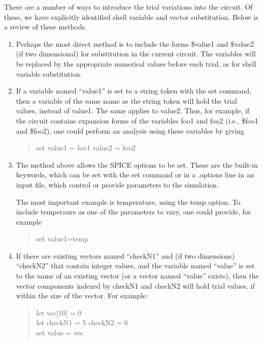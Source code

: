 There are a number of ways to introduce the trial variations into the
circuit.  Of these, we have explicitly identified shell variable and
vector substitution.  Below is a review of these methods.

\begin{enumerate}
\item{
Perhaps the most direct method is to include the forms {\vt \$value1}
and {\vt \$value2} (if two dimensional) for substitution in the
current circuit.  The variables will be replaced by the appropriate
numerical values before each trial, as for shell variable
substitution.
}

\item{
If a variable named ``{\vt value1}'' is set to a string token with the
{\cb set} command, then a variable of the same name as the string
token will hold the trial values, instead of {\vt value1}.  The same
applies to {\vt value2}.  Thus, for example, if the circuit contains
expansion forms of the variables {\vt foo1} and {\vt foo2} (i.e., {\vt
\$foo1} and {\vt \$foo2}), one could perform an analysis using these
variables by giving

\begin{quote}
{\vt set value1 = foo1 value2 = foo2}
\end{quote}
}
       
\item{
The method above allows the SPICE options to be set.  These are the
built-in keywords, which can be set with the {\cb set} command or in a
{\vt .options} line in an input file, which control or provide
parameters to the simulation.

The most important example is temperature, using the {\vt temp}
option.  To include temperaure as one of the parameters to vary, one
could provide, for example

\begin{quote}
{\vt set value1=temp}
\end{quote}
}

\item{
If there are existing vectors named ``{\vt checkN1}'' and (if two
dimensions) ``{\vt checkN2}'' that contain integer values, and the
variable named ``{\vt value}'' is set to the name of an existing
vector (or a vector named ``{\vt value}'' exists), then the vector
components indexed by {\vt checkN1} and {\vt checkN2} will hold trial
values, if within the size of the vector.  For example:

\begin{quote}
{\vt let vec[10] = 0}\\
{\vt let checkN1 = 5 checkN2 = 6}\\
{\vt set value = vec}
\end{quote}

}
\end{enumerate}
